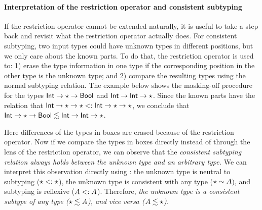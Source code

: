 \paragraph{Interpretation of the restriction operator and consistent subtyping}
If the restriction operator cannot be extended naturally, it is useful to
take a step back and revisit what the restriction operator actually does. For
consistent subtyping, two input types could have unknown types in different
positions, but we only care about the known parts. To do that, the restriction
operator is used to: 1) erase the type information in one type if the corresponding
position in the other type is the unknown type; and 2) compare the resulting types 
using the normal subtyping relation. The example below shows the
masking-off procedure for the types $\mathsf{Int} \to \star \to \mathsf{Bool}$ and $\mathsf{Int} \to
\mathsf{Int} \to \star$. Since the known parts have the relation that $\mathsf{Int} \to
\star \to \star <: \mathsf{Int} \to \star \to \star$, we conclude that
$\mathsf{Int} \to \star \to \mathsf{Bool} \lesssim \mathsf{Int} \to \mathsf{Int} \to \star$.
\begin{center}
\end{center}
Here differences of the types in boxes are erased because of the
restriction operator. Now if we compare the types in boxes directly instead of
through the lens of the restriction operator, we can observe that the
\textit{consistent subtyping relation always holds between the unknown type and
  an arbitrary type.} We can interpret this observation directly using
: the unknown type is neutral to subtyping
($\star <: \star$), the unknown type is consistent with any type
($\star \sim A$), and subtyping is reflexive ($A <: A$). Therefore,
\textit{the unknown type is a consistent subtype of any type ($\star
  \lesssim A$), and vice versa ($A \lesssim \star$).}

